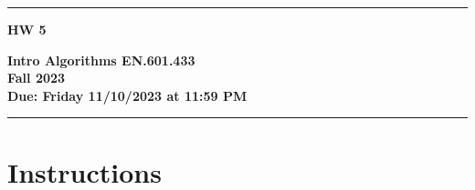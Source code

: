 \documentclass[letter,11pt]{article}
\begin{document}
\noindent\rule[2mm]{\textwidth}{1.5mm}
\noindent
\begin{minipage}{.3\textwidth}
  \vspace{-3mm}
  {\Huge\bf HW 5}
\end{minipage}\hfill\begin{minipage}{.5\textwidth}
\begin{flushright}
  {\bf Intro Algorithms EN.601.433 \\
  Fall 2023 \\
  Due: Friday 11/10/2023 at 11:59 PM}%
\vspace{3mm}
\end{flushright}
\end{minipage}
\noindent\rule{\textwidth}{1.5mm}

\section*{Instructions}
\end{document}
